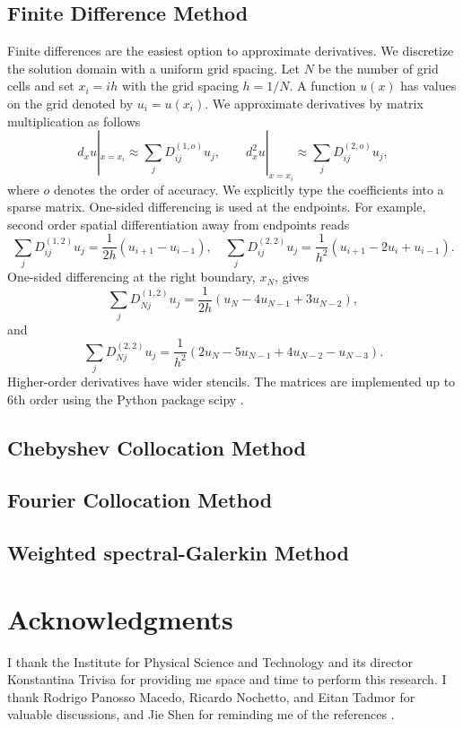 \documentclass[final,onefignum,onetabnum]{siamart190516}
\begin{document}
\subsection{Finite Difference Method}
Finite differences are the easiest option to approximate derivatives. We discretize the solution domain with a uniform grid spacing. Let $N$ be the number of grid cells and set $x_i=i h$ with the grid spacing $h=1/N$. A function $u(x)$ has values on the grid denoted by $u_i=u(x_i)$. We approximate derivatives by matrix multiplication as follows
\[ d_x u|_{x=x_i} \approx \sum_j {D_{ij}^{(1,o)}} u_j, \qquad d_x^2 u|_{x=x_i} \approx \sum_j D_{ij}^{(2,o)} u_j, \]
where $o$ denotes the order of accuracy. We explicitly type the coefficients into a sparse matrix. One-sided differencing is used at the endpoints. For example, second order spatial differentiation away from endpoints reads 
\[ \sum_j {D_{ij}^{(1,2)}} u_j  = \frac{1}{2h} (u_{i+1}- u_{i-1}), \quad \sum_j {D_{ij}^{(2,2)}} u_j = \frac{1}{h^2} (u_{i+1}- 2 u_i + u_{i-1}). \]
One-sided differencing at the right boundary, $x_N$, gives
\[ \sum_j {D_{Nj}^{(1,2)}} u_j = \frac{1}{2h}(u_N - 4 u_{N-1} + 3 u_{N-2}),\]
and
\[ \sum_j {D_{Nj}^{(2,2)}} u_j = \frac{1}{h^2}(2 u_N - 5 u_{N-1} + 4 u_{N-2} - u_{N-3}).\]
Higher-order derivatives have wider stencils. The matrices are implemented up to 6th order using the Python package scipy \cite{2020SciPy-NMeth}.

\subsection{Chebyshev Collocation Method}


\subsection{Fourier Collocation Method}


\subsection{Weighted spectral-Galerkin Method}


\section*{Acknowledgments}
I thank the Institute for Physical Science and Technology and its director Konstantina Trivisa for providing me space and time to perform this research. I thank Rodrigo Panosso Macedo, Ricardo Nochetto, and Eitan Tadmor for valuable discussions, and Jie Shen for reminding me of the references \cite{wang2017perfect, yang2021truly}. 



%


\end{document}
